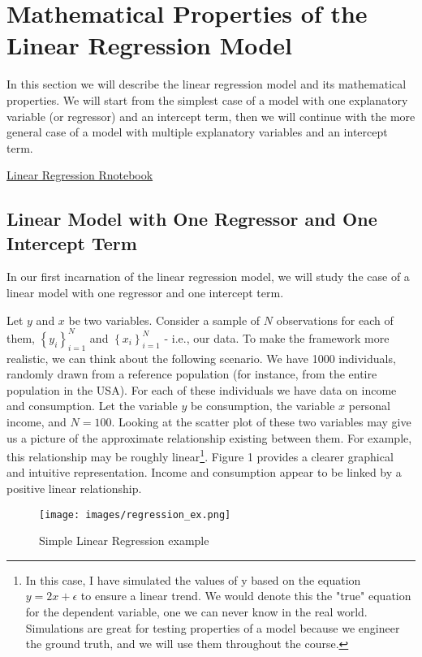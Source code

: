 \section{Mathematical Properties of the Linear Regression Model}
In this section we will describe the linear regression model and its mathematical properties. We will start from the simplest case of a model with one explanatory variable (or regressor) and an intercept term, then we will continue with the more general case of a model with multiple explanatory variables and an intercept term.

\href{https://github.com/Bonorinoa/ECON-167/blob/main/Code/Linear_Regression.Rmd}{Linear Regression Rnotebook}

\subsection{Linear Model with One Regressor and One Intercept Term}
In our first incarnation of the linear regression model, we will study the case of a linear model with one regressor and one intercept term.

Let $y$ and $x$ be two variables. Consider a sample of $N$ observations for each of them, $\left\{y_{i}\right\}_{i=1}^{N}$ and $\left\{x_{i}\right\}_{i=1}^{N}$ - i.e., our data. To make the framework more realistic, we can think about the following scenario. We have 1000 individuals, randomly drawn from a reference population (for instance, from the entire population in the USA). For each of these individuals we have data on income and consumption. Let the variable $y$ be consumption, the variable $x$ personal income, and $N=100$. Looking at the scatter plot of these two variables may give us a picture of the approximate relationship existing between them. For example, this relationship may be roughly linear\footnote{In this case, I have simulated the values of y based on the equation $y=2x+\epsilon$ to ensure a linear trend. We would denote this the "true" equation for the dependent variable, one we can never know in the real world. Simulations are great for testing properties of a model because we engineer the ground truth, and we will use them throughout the course.}. Figure 1 provides a clearer graphical and intuitive representation.  Income and consumption appear to be linked by a positive linear relationship.

\begin{figure}
    \centering
    \texttt{[image: images/regression\_ex.png]}
    \caption{Simple Linear Regression example}
    \label{fig:reg-ex}
\end{figure}

